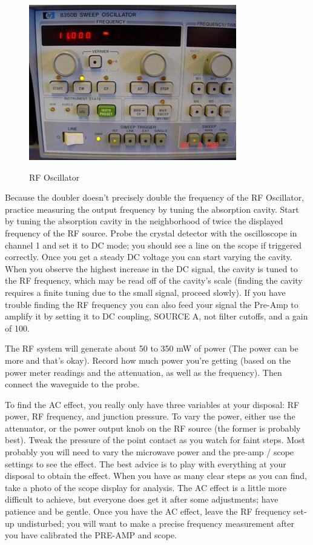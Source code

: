 \documentclass{../lab}
\begin{document}
\begin{figure}[h]
    \centering
    \href{http://experimentationlab.berkeley.edu/sites/default/files/images/JOS16.jpg}{\includegraphics[width=0.4\linewidth]{images/JOS16.jpg}}
    \caption{RF Oscillator}
    \label{fig:RFOscillator}
\end{figure}

Because the doubler doesn't precisely double the frequency of the RF Oscillator, practice measuring the output frequency by tuning the absorption cavity. Start by tuning the absorption cavity in the neighborhood of twice the displayed frequency of the RF source. Probe the crystal detector with the oscilloscope in channel 1 and set it to DC mode; you should see a line on the scope if triggered correctly. Once you get a steady DC voltage you can start varying  the cavity. When you observe the highest increase in the DC signal, the cavity is tuned to the RF frequency, which may be read off of the cavity's scale (finding the cavity requires a finite tuning due to the small signal, proceed slowly). If you have trouble finding the RF frequency you can also feed your signal the Pre-Amp to amplify it by setting it to DC coupling, SOURCE A, not filter cutoffs, and a gain of 100.

The RF system will generate about 50 to 350 mW of power (The power can be more and that's okay). Record how much power you're getting (based on the power meter readings and the attenuation, as well as the frequency). Then connect the waveguide to the probe.

To find the AC effect, you really only have three variables at your disposal: RF power, RF frequency, and junction pressure. To vary the power, either use the attenuator, or the power output knob on the RF source (the former is probably best). Tweak the pressure of the point contact as you watch for faint steps. Most probably you will need to vary the microwave power and the pre-amp / scope settings to see the effect. The best advice is to play with everything at your disposal to obtain the effect. When you have as many clear steps as you can find, take a photo of the scope display for analysis. The AC effect is a little more difficult to achieve, but everyone does get it after some adjustments; have patience and be gentle. Once you have the AC effect, leave the RF frequency set-up undisturbed; you will want to make a precise frequency measurement after you have calibrated the PRE-AMP and scope.
\end{document}
